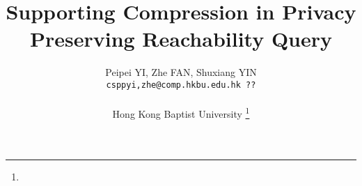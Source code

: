 \documentclass[10pt,conference,letterpaper]{IEEEtran}
\begin{document}
\title{Supporting Compression in Privacy Preserving Reachability Query}

\author{Peipei YI, Zhe FAN, Shuxiang YIN\\
{\tt csppyi,zhe@comp.hkbu.edu.hk ??}

\\
Hong Kong Baptist University
\thanks{}}
\IEEEcompsoctitleabstractindextext{}
%
\maketitle











\end{document}
